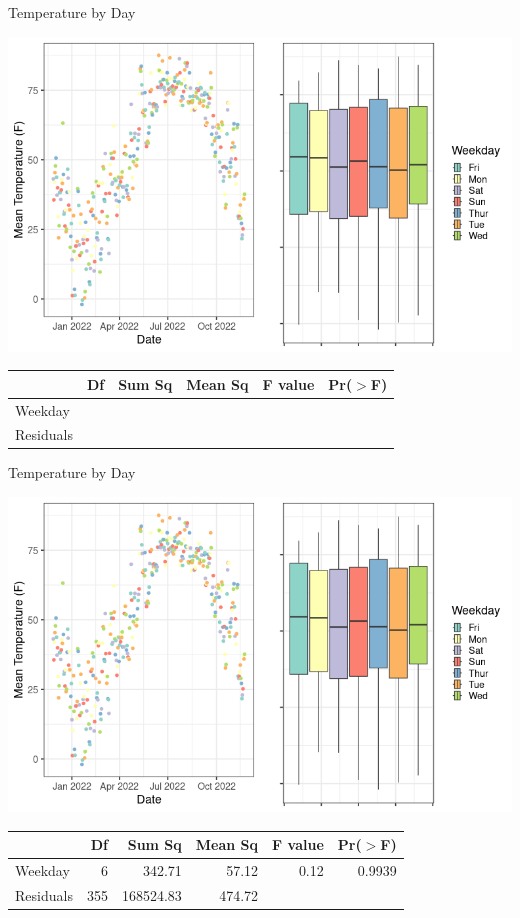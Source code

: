 \documentclass{beamer}
\begin{document}
\begin{frame}{Temperature by Day}
\begin{center}
\includegraphics[scale=0.35]{img/tmp_weekday.png}
\end{center}
{\footnotesize
\begin{table}[ht]
\centering
\begin{tabular}{lrrrrr}
  \hline
 & Df & Sum Sq & Mean Sq & F value & Pr($>$F) \\ 
  \hline
Weekday     &  &  &  &  &  \\ 
  Residuals   &  &  &  &  &  \\ 
   \hline
\end{tabular}
\end{table}
}
\end{frame}

\begin{frame}{Temperature by Day}
\begin{center}
\includegraphics[scale=0.35]{img/tmp_weekday.png}
\end{center}
{\footnotesize
\begin{table}[ht]
\centering
\begin{tabular}{lrrrrr}
  \hline
 & Df & Sum Sq & Mean Sq & F value & Pr($>$F) \\ 
  \hline
Weekday     & 6 & 342.71 & 57.12 & 0.12 & 0.9939 \\ 
  Residuals   & 355 & 168524.83 & 474.72 &  &  \\ 
   \hline
\end{tabular}
\end{table}
}
\end{frame}
\end{document}
